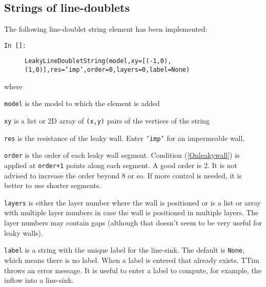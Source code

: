 \documentclass [10pt,letterpaper] {article}
\begin{document}
\subsection{Strings of line-doublets}
The following line-doublet string element has been implemented:
\begin{description}
\item[{\tt In []:}]{\tt LeakyLineDoubletString(model,xy=[(-1,0),(1,0)],res='imp',order=0,layers=0,label=None)}
\end{description}
where
\begin{description}
    \item {\tt model} is the model to which the element is
    added
    \item {\tt xy} is a list or 2D array of {\tt (x,y)} pairs of the vertices of the string 
    \item {\tt res} is the resistance of the leaky wall. Enter {\tt 'imp'} for an impermeable wall.
    \item {\tt order} is the order of each leaky wall segment. Condition (\ref{Qnleakywall}) is applied at {\tt order+1} points along each segment. A good order is 2. It is not advised to increase the order beyond 8 or so. If more control is needed, it is better to use shorter segments. 
    \item {\tt layers} is either the layer number where the wall is positioned or is a list or array with
    multiple layer numbers in case the wall is positioned in multiple layers. The layer numbers may contain gaps (although that doesn't seem to be very useful for leaky walls).
    \item {\tt label} is a string with the unique label for the line-sink. The default is {\tt None}, which means there is no label. When a label is entered that already exists, TTim throws an error message. It is useful to enter a label to compute, for example, the inflow into a line-sink.
\end{description}
\end{document}
